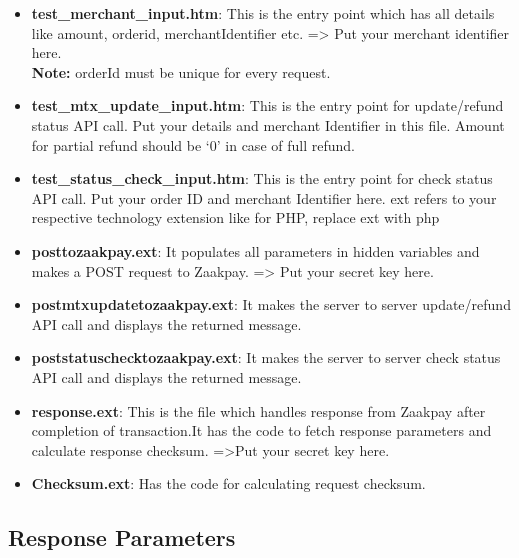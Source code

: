 \documentclass{article}
\begin{document}
\begin{itemize}
\item {\bfseries test\_merchant\_input.htm}: This is the entry point which has all details like amount, orderid, merchantIdentifier etc. => Put your merchant identifier here.\\
{\bfseries Note:} orderId must be unique for every request.
\item {\bfseries test\_mtx\_update\_input.htm}: This is the entry point for update/refund status API call.
Put your details and merchant Identifier in this file. Amount for partial refund should be ‘0’ in case of full refund.
\item {\bfseries test\_status\_check\_input.htm}: This is the entry point for check status API call. Put your order ID and merchant Identifier here. ext refers to your respective technology extension like for PHP, replace ext with php
\item {\bfseries posttozaakpay.ext}: It populates all parameters in hidden variables and makes a POST request to Zaakpay. => Put your secret key here.
\item {\bfseries postmtxupdatetozaakpay.ext}: It makes the server to server update/refund API call and displays the returned message.
\item {\bfseries poststatuschecktozaakpay.ext}: It makes the server to server check status API call and displays the returned message.
\item {\bfseries response.ext}: This is the file which handles response from Zaakpay after completion of transaction.It has the code to fetch response parameters and calculate response checksum. =>Put your secret key here.
\item {\bfseries Checksum.ext}: Has the code for calculating request checksum.
\end{itemize}

\subsection{Response Parameters}
\end{document}
